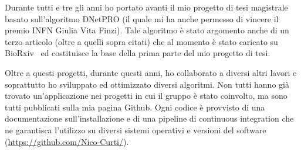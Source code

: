 \documentclass{standalone}
\begin{document}
Durante tutti e tre gli anni ho portato avanti il mio progetto di tesi magistrale basato sull'algoritmo DNetPRO (il quale mi ha anche permesso di vincere il premio INFN Giulia Vita Finzi).
Tale algoritmo è stato argomento anche di un terzo articolo (oltre a quelli sopra citati) che al momento è stato caricato su BioRxiv~\cite{Curti2019} ed costituisce la base della prima parte del mio progetto di tesi.

Oltre a questi progetti, durante questi anni, ho collaborato a diversi altri lavori e soprattutto ho sviluppato ed ottimizzato diversi algoritmi.
Non tutti hanno già trovato un'applicazione nei progetti in cui il gruppo è stato coinvolto, ma sono tutti pubblicati sulla mia pagina Github.
Ogni codice è provvisto di una documentazione sull'installazione e di una pipeline di continuous integration che ne garantisca l'utilizzo su diversi sistemi operativi e versioni del software (\url{https://github.com/Nico-Curti/}).
\end{document}
